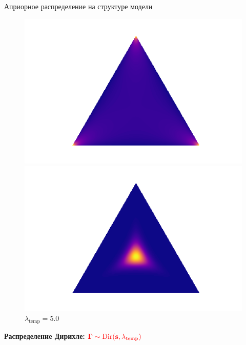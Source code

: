 \documentclass[usenames,dvipsnames,11pt,pdf,utf8,russian,aspectratio=43]{beamer}
\begin{document}
\begin{frame}{Априорное распределение на структуре модели}
\begin{figure}
\begin{minipage}[t]{.3\textwidth}
\begin{tikzpicture}[%
x={(1.7cm,0cm)},
y={(0cm,1.7cm)},
]
\end{tikzpicture}
\caption*{$\lambda_\text{temp}\to0$}
\end{minipage}
\hfill
 \begin{minipage}[t]{.3\textwidth}
   \includegraphics[width=\textwidth]{gs0995.png}
\caption*{$\lambda_\text{temp}=0.995$}
\end{minipage}
\hfill
 \begin{minipage}[t]{.3\textwidth}
   \includegraphics[width=\textwidth]{gs5.png}
\caption*{$\lambda_\text{temp}=5.0$}
\end{minipage}

\end{figure}

\textbf{Распределение Дирихле: }$\textcolor{red}{\boldsymbol{\Gamma}\sim \text{Dir}(\mathbf{s}, \lambda_\text{temp})}$\\
\begin{figure}
 \begin{minipage}[t]{.3\textwidth}
        \centering
\begin{tikzpicture}[%
x={(1.7cm,0cm)},
y={(0cm,1.7cm)},
]


\end{tikzpicture}
\end{minipage}
\end{figure}
\end{frame}
\end{document}
